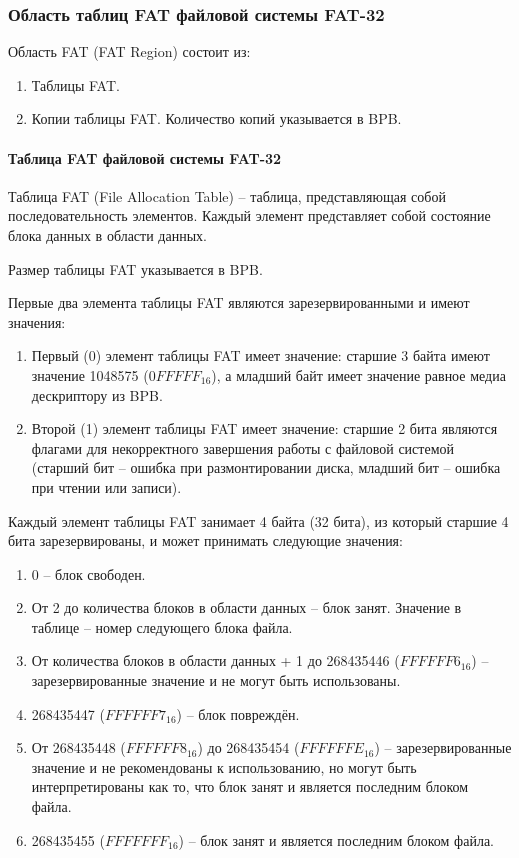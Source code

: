 \subsubsection{Область таблиц FAT файловой системы FAT-32}

Область FAT (FAT Region) состоит из:

\begin{enumerate}
\item Таблицы FAT.
\item Копии таблицы FAT. Количество копий указывается в BPB.
\end{enumerate}

\paragraph{Таблица FAT файловой системы FAT-32}

Таблица FAT (File Allocation Table) -- таблица, представляющая собой последовательность элементов. Каждый элемент представляет собой состояние блока данных в области данных.

Размер таблицы FAT указывается в BPB.

Первые два элемента таблицы FAT являются зарезервированными и имеют значения:

\begin{enumerate}
\item Первый (0) элемент таблицы FAT имеет значение: старшие 3 байта имеют значение 1048575 ($0FFFFF_{16}$), а младший байт имеет значение равное медиа дескриптору из BPB.
\item Второй (1) элемент таблицы FAT имеет значение: старшие 2 бита являются флагами для некорректного завершения работы с файловой системой (старший бит -- ошибка при размонтировании диска, младший бит -- ошибка при чтении или записи).
\end{enumerate}

Каждый элемент таблицы FAT занимает 4 байта (32 бита), из который старшие 4 бита зарезервированы, и может принимать следующие значения:

\begin{enumerate}
\item 0 -- блок свободен.
\item От 2 до количества блоков в области данных -- блок занят. Значение в таблице -- номер следующего блока файла.
\item От количества блоков в области данных + 1 до 268435446 ($FFFFFF6_{16}$) -- зарезервированные значение и не могут быть использованы.
\item 268435447 ($FFFFFF7_{16}$) -- блок повреждён.
\item От 268435448 ($FFFFFF8_{16}$) до 268435454 ($FFFFFFE_{16}$) -- зарезервированные значение и не рекомендованы к использованию, но могут быть интерпретированы как то, что блок занят и является последним блоком файла.
\item 268435455 ($FFFFFFF_{16}$) -- блок занят и является последним блоком файла.
\end{enumerate}


